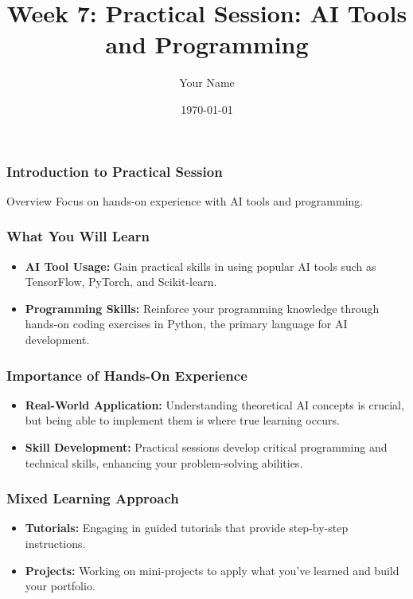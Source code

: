 \documentclass{beamer}
\title{Week 7: Practical Session: AI Tools and Programming}
\author{Your Name}
\institute{Your Institution}
\date{\today}
\begin{document}
\frame{\titlepage}

\begin{frame}[fragile]
    \frametitle{Introduction to Practical Session}
    \begin{block}{Overview}
        Focus on hands-on experience with AI tools and programming.
    \end{block}
\end{frame}

\begin{frame}[fragile]
    \frametitle{What You Will Learn}
    \begin{itemize}
        \item \textbf{AI Tool Usage:} Gain practical skills in using popular AI tools such as TensorFlow, PyTorch, and Scikit-learn.
        \item \textbf{Programming Skills:} Reinforce your programming knowledge through hands-on coding exercises in Python, the primary language for AI development.
    \end{itemize}
\end{frame}

\begin{frame}[fragile]
    \frametitle{Importance of Hands-On Experience}
    \begin{itemize}
        \item \textbf{Real-World Application:} Understanding theoretical AI concepts is crucial, but being able to implement them is where true learning occurs.
        \item \textbf{Skill Development:} Practical sessions develop critical programming and technical skills, enhancing your problem-solving abilities.
    \end{itemize}
\end{frame}

\begin{frame}[fragile]
    \frametitle{Mixed Learning Approach}
    \begin{itemize}
        \item \textbf{Tutorials:} Engaging in guided tutorials that provide step-by-step instructions.
        \item \textbf{Projects:} Working on mini-projects to apply what you’ve learned and build your portfolio.
    \end{itemize}
\end{frame}
\end{document}
